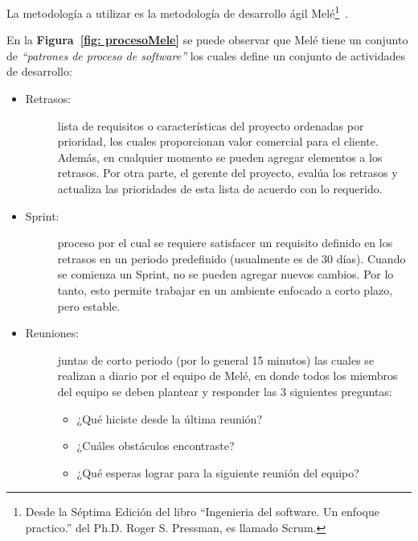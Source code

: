 La metodología a utilizar es la metodología de desarrollo ágil Melé\footnote{Desde la Séptima Edición del libro ``Ingenieria del software. Un enfoque practico.'' del Ph.D. Roger S. Pressman, es llamado Scrum. }~\cite{7}.

En la \textbf{Figura~\ref{fig: procesoMele}} se puede observar que Melé tiene un conjunto de \emph{``patrones de proceso de software''} los cuales define un conjunto de actividades de desarrollo:

\begin{itemize}
	\item 	\begin{description}
				\item[Retrasos:] lista de requisitos o características del proyecto ordenadas por prioridad, los cuales proporcionan valor comercial para el cliente. Además, en cualquier momento se pueden agregar elementos a los retrasos. Por otra parte, el gerente del proyecto, evalúa los retrasos y actualiza las prioridades de esta lista de acuerdo con lo requerido. 
			\end{description}

	\item 	\begin{description}
				\item[Sprint:] proceso por el cual se requiere satisfacer un requisito definido en los retrasos en un periodo predefinido (usualmente es de 30 días). Cuando se comienza un Sprint, no se pueden agregar nuevos cambios. Por lo tanto, esto permite trabajar en un ambiente enfocado a corto plazo, pero estable.
			\end{description}

	\item 	\begin{description}
			    \item[Reuniones:] juntas de corto periodo (por lo general 15 minutos) las cuales se realizan a diario por el equipo de Melé, en donde todos los miembros del equipo se deben plantear y responder las 3 siguientes preguntas: 
% 
			    \begin{itemize}
			    	\item ¿Qué hiciste desde la última reunión?

			    	\item ¿Cuáles obstáculos encontraste? 

			    	\item ¿Qué esperas lograr para la siguiente reunión del equipo?
			    \end{itemize}


\end{description}
\end{itemize}
